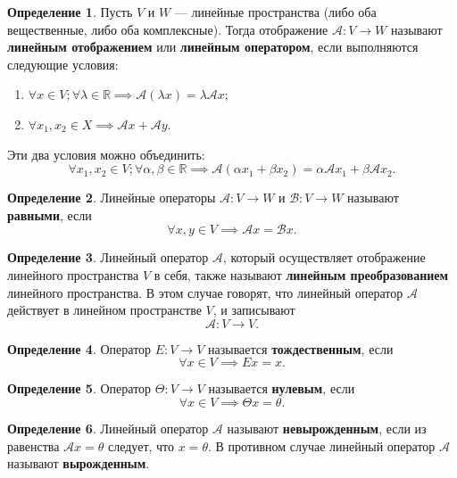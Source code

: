 \documentclass[a5paper, 11pt]{extbook}
\theoremstyle{definition}
\theoremstyle{definition}
\newtheorem{definition}{Определение}[section]
\theoremstyle{definition}
\begin{document}
\begin{definition}
    Пусть \(V\) и \(W\) — линейные пространства (либо оба вещественные, либо оба комплексные). Тогда отображение \(\mathcal{A}: V \to W\) называют \textbf{линейным отображением} или \textbf{линейным оператором}, если выполняются следующие условия:
    \begin{enumerate}
        \item \(\forall x \in V; \forall \lambda \in \mathbb{R} \implies \mathcal{A} (\lambda x) = \lambda \mathcal{A} x\);
        \item \(\forall x_1, x_2 \in X \implies \mathcal{A} x + \mathcal{A} y\).
    \end{enumerate}
    Эти два условия можно объединить:
    \[
        \forall x_1, x_2 \in V; \forall \alpha, \beta \in \mathbb{R}
        \implies
        \mathcal{A} (\alpha x_1 + \beta x_2) = \alpha \mathcal{A} x_1 + \beta \mathcal{A} x_2.
    \]
\end{definition}

\begin{definition}
    Линейные операторы \(\mathcal{A}: V \to W\) и \(\mathcal{B}: V \to W\) называют \textbf{равными}, если
    \[
        \forall x, y \in V
        \implies
        \mathcal{A} x = \mathcal{B} x.
    \]
\end{definition}

\begin{definition}
    Линейный оператор \(\mathcal{A}\), который осуществляет отображение линейного пространства \(V\) в себя, также называют \textbf{линейным преобразованием} линейного пространства. В этом случае говорят, что линейный оператор \(\mathcal{A}\) действует в линейном пространстве \(V\), и записывают
    \[
        \mathcal{A}: V \to V.
    \]
\end{definition}

\begin{definition}
    Оператор \(E: V \to V\) называется \textbf{тождественным}, если
    \[
        \forall x \in V \implies E x = x.
    \]
\end{definition}

\begin{definition}
    Оператор \(\Theta: V \to V\) называется \textbf{нулевым}, если
    \[
        \forall x \in V \implies \Theta x = \theta.
    \]
\end{definition}

\begin{definition}
    Линейный оператор \(\mathcal{A}\) называют \textbf{невырожденным}, если из равенства \(\mathcal{A} x = \theta\) следует, что \(x = \theta\). В противном случае линейный оператор \(\mathcal{A}\) называют \textbf{вырожденным}.
\end{definition}
\end{document}
